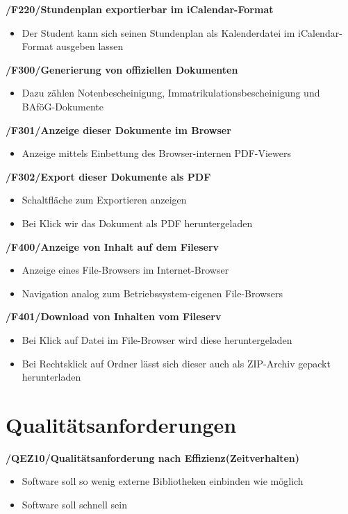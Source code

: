 \documentclass[12pt, a4paper]{scrartcl}
\newcommand{\ford}[2]{\textbf{/#1/\hspace{2em}#2}}
\begin{document}
\ford{F220}{Stundenplan exportierbar im iCalendar-Format}
\begin{itemize}
	\item Der Student kann sich seinen Stundenplan als Kalenderdatei im iCalendar-Format ausgeben lassen
\end{itemize}

\ford{F300}{Generierung von offiziellen Dokumenten}
\begin{itemize}
	\item Dazu zählen Notenbescheinigung, Immatrikulationsbescheinigung und BAföG-Dokumente
\end{itemize}

\ford{F301}{Anzeige dieser Dokumente im Browser}
\begin{itemize}
	\item Anzeige mittels Einbettung des Browser-internen PDF-Viewers
\end{itemize}

\ford{F302}{Export dieser Dokumente als PDF}
\begin{itemize}
	\item Schaltfläche zum Exportieren anzeigen
	\item Bei Klick wir das Dokument als PDF heruntergeladen
\end{itemize}

\ford{F400}{Anzeige von Inhalt auf dem Fileserv}
\begin{itemize}
	\item Anzeige eines File-Browsers im Internet-Browser
	\item Navigation analog zum Betriebssystem-eigenen File-Browsers
\end{itemize}

\ford{F401}{Download von Inhalten vom Fileserv}
\begin{itemize}
	\item Bei Klick auf Datei im File-Browser wird diese heruntergeladen
	\item Bei Rechtsklick auf Ordner lässt sich dieser auch als ZIP-Archiv gepackt herunterladen
\end{itemize}
\newpage

\section{Qualitätsanforderungen}

\ford{QEZ10}{Qualitätsanforderung nach Effizienz(Zeitverhalten)}
\begin{itemize}
	\item Software soll so wenig externe Bibliotheken einbinden wie möglich
	\item Software soll schnell sein
\end{itemize}
\end{document}
